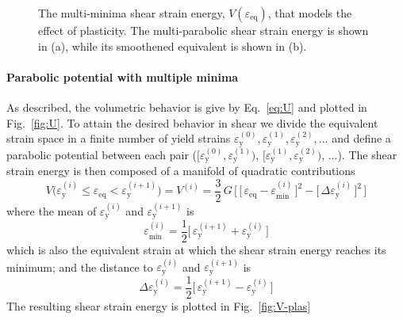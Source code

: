 \documentclass[times,namecite]{goose-article}
\begin{document}
\begin{figure}[htp]
\begin{minipage}[t]{.49\textwidth}
    \label{fig:V-plas-smooth}
  \end{minipage}
  \caption{The multi-minima shear strain energy, $V ( \varepsilon_\mathrm{eq} )$, that models the effect of plasticity. The multi-parabolic shear strain energy is shown in (a), while its smoothened equivalent is shown in (b).}
\end{figure}

\paragraph{Parabolic potential with multiple minima}

As described, the volumetric behavior is give by Eq.~\eqref{eq:U} and plotted in Fig.~\ref{fig:U}. To attain the desired behavior in shear we divide the equivalent strain space in a finite number of yield strains $\varepsilon_\mathrm{y}^{(0)}, \varepsilon_\mathrm{y}^{(1)}, \varepsilon_\mathrm{y}^{(2)}, ...$ and define a parabolic potential between each pair ($[ \varepsilon_\mathrm{y}^{(0)}, \varepsilon_\mathrm{y}^{(1)} )$, $[ \varepsilon_\mathrm{y}^{(1)}, \varepsilon_\mathrm{y}^{(2)} )$, ...). The shear strain energy is then composed of a manifold of quadratic contributions
\begin{equation}\label{eq:V-plas}
  V \big(
    \varepsilon_\mathrm{y}^{(i)} \leq \varepsilon_\mathrm{eq} < \varepsilon_\mathrm{y}^{(i+1)}
  \big)
  =
  V^{(i)}
  =
  \frac{3}{2} \, G \, \bigg[\,
    \Big[\, \varepsilon_\mathrm{eq} - \varepsilon_\mathrm{min}^{(i)} \,\Big]^2
    -
    \Big[\, \Delta \varepsilon_\mathrm{y}^{(i)} \,\Big]^2
  \,\bigg]
\end{equation}
where the mean of $\varepsilon_\mathrm{y}^{(i)}$ and $\varepsilon_\mathrm{y}^{(i+1)}$ is
\begin{equation}
  \varepsilon_\mathrm{min}^{(i)}
  =
  \frac{1}{2} \Big[\, \varepsilon_\mathrm{y}^{(i+1)} + \varepsilon_\mathrm{y}^{(i)} \,\Big]
\end{equation}
which is also the equivalent strain at which the shear strain energy reaches its minimum; and the distance to $\varepsilon_\mathrm{y}^{(i)}$ and $\varepsilon_\mathrm{y}^{(i+1)}$ is
\begin{equation}
  \Delta \varepsilon_\mathrm{y}^{(i)}
  =
  \frac{1}{2} \Big[\, \varepsilon_\mathrm{y}^{(i+1)} - \varepsilon_\mathrm{y}^{(i)} \,\Big]
\end{equation}
The resulting shear strain energy is plotted in Fig.~\ref{fig:V-plas}
\end{document}
